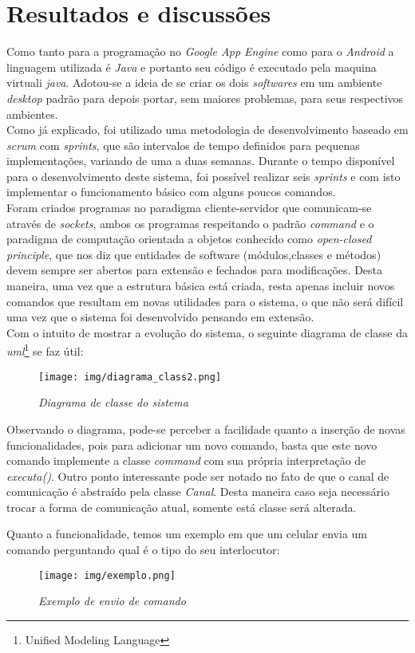 \chapter{Resultados e discussões}

Como tanto para a programação no \emph{Google App Engine} como para o \emph{Android} a linguagem utilizada é \emph{Java} e portanto seu código é executado pela maquina virtuali \emph{java}. Adotou-se a ideia de se criar os dois \emph{softwares} em um ambiente \emph{desktop} padrão para depois portar, sem maiores problemas, para seus respectivos ambientes.\\

 Como  já explicado, foi utilizado uma metodologia de desenvolvimento baseado em \emph{scrum} com \emph{sprints}, que são intervalos de tempo definidos para pequenas implementações, variando de uma a duas semanas. Durante o tempo disponível para o desenvolvimento deste sistema, foi possível realizar seis \emph{sprints} e com isto implementar o funcionamento básico com alguns poucos comandos.\\

 Foram criados programas no paradigma cliente-servidor que comunicam-se através de \emph{sockets}, ambos os programas respeitando o padrão \emph{command} e o paradigma de computação orientada a objetos conhecido como \emph{open-closed principle}, que nos diz que entidades de software (módulos,classes e métodos) devem sempre ser abertos para extensão e fechados para modificações. Desta maneira, uma vez que a estrutura básica está criada, resta apenas incluir novos comandos que resultam em novas utilidades para o sistema, o que não será difícil uma vez que o sistema foi desenvolvido pensando em extensão.\\

\newpage 
Com o intuito de mostrar a evolução do sistema, o seguinte diagrama de classe da \emph{uml}\footnote{Unified Modeling Language} se faz útil:\\

\begin{figure}[h]
    \texttt{[image: img/diagrama\_class2.png]}\\
    \caption{\it Diagrama de classe do sistema}
\end{figure}

Observando o diagrama, pode-se perceber a facilidade quanto a inserção de novas funcionalidades, pois para adicionar um novo comando, basta que este novo comando implemente a classe \emph{command} com sua própria interpretação de \emph{executa()}. Outro ponto interessante pode ser notado no fato de que o canal de comunicação é abstraído pela classe \emph{Canal}. Desta maneira caso seja necessário trocar a forma de comunicação atual, somente está classe será alterada.
 
\newpage
Quanto a funcionalidade, temos um exemplo em que um celular envia um comando perguntando qual é o tipo do seu interlocutor:\\
 \begin{figure}[h]
    \texttt{[image: img/exemplo.png]}\\
    \caption{\it Exemplo de envio de comando}
\end{figure}


